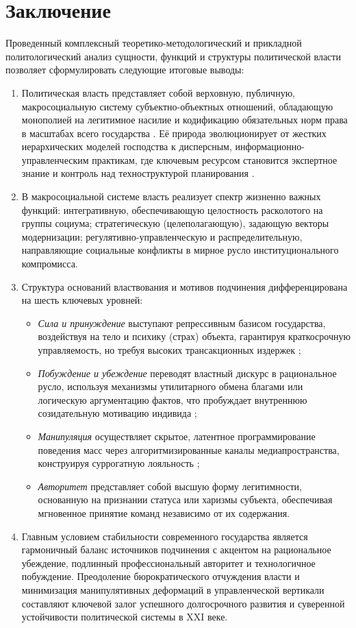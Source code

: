 \section*{Заключение}

Проведенный комплексный теоретико-методологический и прикладной политологический анализ сущности, функций и структуры политической власти позволяет сформулировать следующие итоговые выводы:

\begin{enumerate}
    \item Политическая власть представляет собой верховную, публичную, макросоциальную систему субъектно-объектных отношений, обладающую монополией на легитимное насилие и кодификацию обязательных норм права в масштабах всего государства \cite{Solovyev}. Её природа эволюционирует от жестких иерархических моделей господства к дисперсным, информационно-управленческим практикам, где ключевым ресурсом становится экспертное знание и контроль над техноструктурой планирования \cite{Gelbreyt}.
    \item В макросоциальной системе власть реализует спектр жизненно важных функций: интегративную, обеспечивающую целостность расколотого на группы социума; стратегическую (целеполагающую), задающую векторы модернизации; регулятивно-управленческую и распределительную, направляющие социальные конфликты в мирное русло институционального компромисса.
    \item Структура оснований властвования и мотивов подчинения дифференцирована на шесть ключевых уровней:
    \begin{itemize}
        \item \textit{Сила и принуждение} выступают репрессивным базисом государства, воздействуя на тело и психику (страх) объекта, гарантируя краткосрочную управляемость, но требуя высоких трансакционных издержек \cite{Solovyev};
        \item \textit{Побуждение и убеждение} переводят властный дискурс в рациональное русло, используя механизмы утилитарного обмена благами или логическую аргументацию фактов, что пробуждает внутреннюю созидательную мотивацию индивида \cite{Gelbreyt};
        \item \textit{Манипуляция} осуществляет скрытое, латентное программирование поведения масс через алгоритмизированные каналы медиапространства, конструируя суррогатную лояльность \cite{Toschenko};
        \item \textit{Авторитет} представляет собой высшую форму легитимности, основанную на признании статуса или харизмы субъекта, обеспечивая мгновенное принятие команд независимо от их содержания.
    \end{itemize}
    \item Главным условием стабильности современного государства является гармоничный баланс источников подчинения с акцентом на рациональное убеждение, подлинный профессиональный авторитет и технологичное побуждение. Преодоление бюрократического отчуждения власти и минимизация манипулятивных деформаций в управленческой вертикали составляют ключевой залог успешного долгосрочного развития и суверенной устойчивости политической системы в XXI веке.
\end{enumerate}